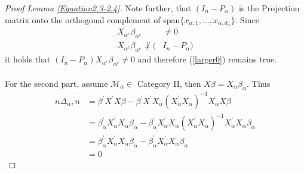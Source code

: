 \documentclass[Research_Module_ES.tex]{subfiles}
\begin{document}
\begin{proof}[Proof Lemma \ref{Equation2.3-2.4}]
	Note further, that $(I_n-P_\alpha)$ is the Projection matrix onto the orthogonal complement of span$\{x_{\alpha,1},\ldots,x_{\alpha,d_\alpha}\}$. Since
	\begin{align*}
		X_{\alpha^c}\beta_{\alpha^c}&\neq 0\\
		X_{\alpha^c}\beta_{\alpha^c}\not\perp (&I_n-P_\alpha)
	\end{align*}
	it holds that $(I_n-P_\alpha) X_{\alpha^c}\beta_{\alpha^c}\neq 0$ and therefore (\ref{larger0}) remains true.\\
	\\
	For the second part, assume $\mathcal{M}_\alpha\in$ Category II, then $X\beta=X_\alpha\beta_\alpha$. Thus
	\begin{align*}
		n\Delta_\alpha,n&=\beta^\prime X^\prime X\beta-\beta^\prime X^\prime X_\alpha \left(X_\alpha^\prime X_\alpha\right)^{-1}X_\alpha^\prime X\beta\\
		&=\beta_\alpha^\prime X_\alpha^\prime X_\alpha \beta_\alpha -\beta_\alpha^\prime X_\alpha^\prime X_\alpha\left(X_\alpha^\prime X_\alpha\right)^{-1} X_\alpha^\prime X_\alpha\beta_\alpha\\
		&=\beta_\alpha^\prime X_\alpha^\prime X_\alpha \beta_\alpha - \beta_\alpha^\prime X_\alpha^\prime X_\alpha \beta_\alpha\\
		&=0
	\end{align*}
	
\end{proof}
\end{document}
